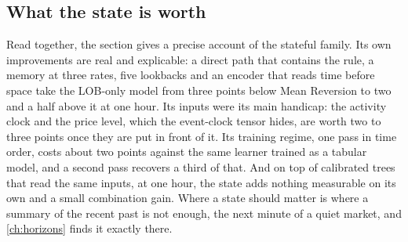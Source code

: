 \subsection{What the state is worth}
\label{sec:stateful:worth}

Read together, the section gives a precise account of the stateful family.  Its own
improvements are real and explicable: a direct path that contains the rule, a memory at
three rates, five lookbacks and an encoder that reads time before space take the LOB-only
model from three points below Mean Reversion to two and a half above it at one hour.  Its inputs were
its main handicap: the activity clock and the price level, which the event-clock tensor
hides, are worth two to three points once they are put in front of it.  Its training
regime, one pass in time order, costs about two points against the same learner trained as
a tabular model, and a second pass recovers a third of that.  And on top of calibrated trees
that read the same inputs, at one hour, the state adds nothing measurable on its own and a
small combination gain.  Where a state should matter is where a summary of the recent past
is not enough, the next minute of a quiet market, and \cref{ch:horizons} finds it exactly
there.

